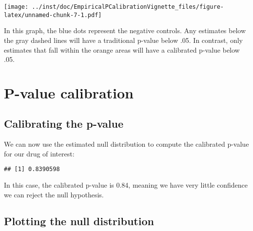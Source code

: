 \documentclass[]{article}
\newenvironment{Shaded}{\begin{snugshade}}{\end{snugshade}}
\newcommand{\DataTypeTok}[1]{\textcolor[rgb]{0.13,0.29,0.53}{#1}}
\newcommand{\KeywordTok}[1]{\textcolor[rgb]{0.13,0.29,0.53}{\textbf{#1}}}
\newcommand{\NormalTok}[1]{#1}
\newcommand{\OperatorTok}[1]{\textcolor[rgb]{0.81,0.36,0.00}{\textbf{#1}}}
\newcommand{\StringTok}[1]{\textcolor[rgb]{0.31,0.60,0.02}{#1}}
\begin{document}
\begin{Shaded}
\end{Shaded}

\texttt{[image: ../inst/doc/EmpiricalPCalibrationVignette\_files/figure-latex/unnamed-chunk-7-1.pdf]}

In this graph, the blue dots represent the negative controls. Any
estimates below the gray dashed lines will have a traditional p-value
below .05. In contrast, only estimates that fall within the orange areas
will have a calibrated p-value below .05.

\hypertarget{p-value-calibration}{%
\section{P-value calibration}\label{p-value-calibration}}

\hypertarget{calibrating-the-p-value}{%
\subsection{Calibrating the p-value}\label{calibrating-the-p-value}}

We can now use the estimated null distribution to compute the calibrated
p-value for our drug of interest:

\begin{Shaded}
\end{Shaded}

\begin{verbatim}
## [1] 0.8390598
\end{verbatim}

In this case, the calibrated p-value is 0.84, meaning we have very
little confidence we can reject the null hypothesis.

\hypertarget{plotting-the-null-distribution-1}{%
\subsection{Plotting the null
distribution}\label{plotting-the-null-distribution-1}}
\end{document}
